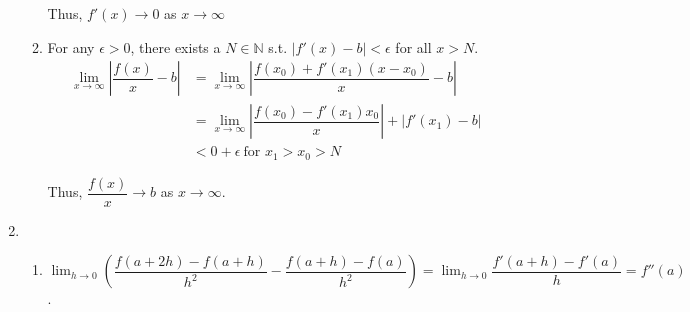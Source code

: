 \documentclass[12pt]{article}
\begin{document}
\begin{enumerate}
\begin{enumerate}
        Thus, $f'(x) \to 0$ as $x\to \infty$

        \newpage
        \item For any $\epsilon > 0$, there exists a $N\in\mathbb{N}$ s.t. $|f'(x) - b| < \epsilon$ for all $x > N$.\begin{align*}
            \lim_{x\to\infty}|\dfrac{f(x)}{x} - b| &= \lim_{x\to\infty}|\dfrac{f(x_0) + f'(x_1)(x-x_0)}{x} - b|\\
            &=\lim_{x\to\infty} |\dfrac{f(x_0)- f'(x_1)x_0}{x}| + |f'(x_1) - b|\\
            &< 0 + \epsilon\ \text{for } x_1 > x_0 > N
        \end{align*}

        Thus, $\dfrac{f(x)}{x} \to b$ as $x\to\infty$.
    \end{enumerate}

    \item\begin{enumerate}
        \item $\displaystyle\lim_{h\to 0}(\dfrac{f(a+2h) - f(a+h)}{h^2} - \dfrac{f(a+h) - f(a)}{h^2}) = \displaystyle\lim_{h\to 0} \dfrac{f'(a+h) - f'(a)}{h}= f''(a)$.
    \end{enumerate}
\end{enumerate}
\end{document}
